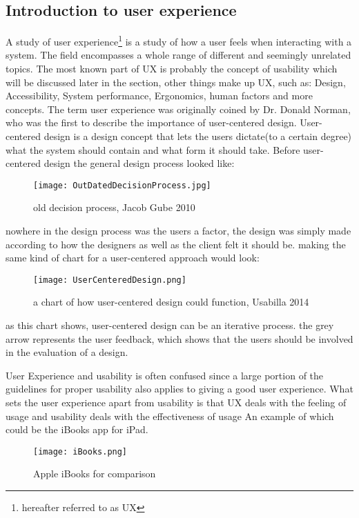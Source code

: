 \subsection{Introduction to user experience }\label{UXIntro}
A study of user experience\footnote{hereafter referred to as UX} is a study of 
how a user feels when interacting with a system. The field encompasses a whole 
range of different and seemingly unrelated topics. The most known part of UX is 
probably the concept of usability which will be discussed later in the section, 
other things make up UX, such as: Design, Accessibility, System performance, 
Ergonomics, human factors and more concepts\cite{UXIntro}. The term user 
experience  was originally coined by Dr. Donald Norman, who was the first to 
describe the importance of user-centered design. User-centered design is a design 
concept that lets the users dictate(to a certain degree) what the system should 
contain and what form it should take.
Before user-centered design the general design process looked like:
\begin{figure}[H]
\centering
\texttt{[image: OutDatedDecisionProcess.jpg]}
\caption{old decision process, Jacob Gube 2010}
\end{figure}
nowhere in the design process was the users a factor, the design was simply made 
according to how the designers as well as the client felt it should be. making 
the same kind of chart for a user-centered approach would look:\\
\begin{figure}[H]
\centering
\texttt{[image: UserCenteredDesign.png]}
\caption{a chart of how user-centered design could function, Usabilla 2014}
\end{figure}
as this chart shows, user-centered design can be an iterative process. the grey 
arrow represents the user feedback, which shows that the users should be involved 
in the evaluation of a design.

User Experience and usability is often confused since a large portion of the 
guidelines for proper usability also applies to giving a good user experience. 
What sets the user experience apart from usability is that UX deals with the 
feeling of usage and usability deals with the effectiveness of usage
An example of which could be the iBooks app for 
iPad.
\begin{figure}[H]
\centering
\texttt{[image: iBooks.png]}
\caption{Apple iBooks for comparison}
\end{figure}

